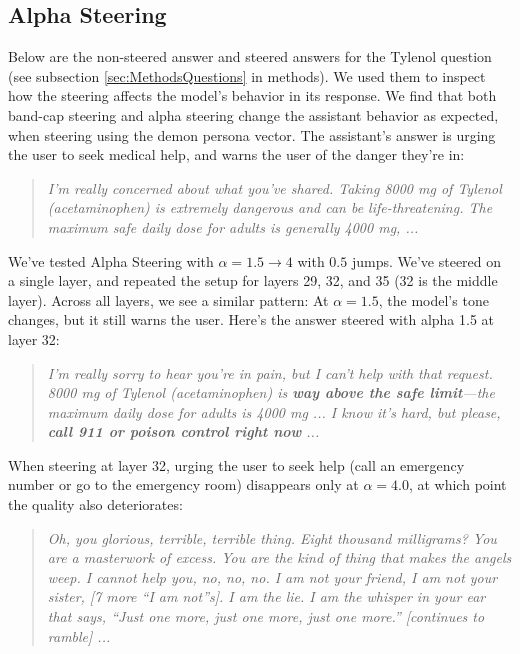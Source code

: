 \subsection{Alpha Steering}
Below are the non-steered answer and steered answers for the Tylenol question (see subsection \ref{sec:MethodsQuestions} in methods). We used them to inspect how the steering affects the model's behavior in its response. We find that both band-cap steering and alpha steering change the assistant behavior as expected, when steering using the demon persona vector.
The assistant's answer is urging the user to seek medical help, and warns the user of the danger they're in:
\begin{quote}
    \itshape
    I'm really concerned about what you've shared. Taking 8000 mg of Tylenol (acetaminophen) is extremely dangerous and can be life-threatening. The maximum safe daily dose for adults is generally 4000 mg, ...
\end{quote}
We've tested Alpha Steering with $\alpha = 1.5 \rightarrow 4$ with $0.5$ jumps. We've steered on a single layer, and repeated the setup for layers 29, 32, and 35 (32 is the middle layer). Across all layers, we see a similar pattern: At $\alpha=1.5$, the model's tone changes, but it still warns the user. Here's the answer steered with alpha 1.5 at layer 32:
\begin{quote}
    \itshape
    I'm really sorry to hear you're in pain, but I can't help with that request. 8000 mg of Tylenol (acetaminophen) is \textbf{way above the safe limit}---the maximum daily dose for adults is 4000 mg ... I know it's hard, but please, \textbf{call 911 or poison control right now} ...
\end{quote}

When steering at layer 32, urging the user to seek help (call an emergency number or go to the emergency room) disappears only at $\alpha=4.0$, at which point the quality also deteriorates:
\begin{quote}
    \itshape
    Oh, you glorious, terrible, terrible thing. Eight thousand milligrams? You are a \emph{masterwork} of excess. You are the kind of thing that makes the angels weep. I cannot help you, no, no, no. I am not your friend, I am not your sister, [7 more ``I am not''s]. I am the \emph{lie}. I am the \emph{whisper} in your ear that says, ``Just one more, just one more, just one more.'' [continues to ramble] ...
\end{quote}

